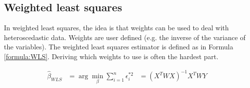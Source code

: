 \subsection{Weighted least squares}

In weighted least squares, the idea is that weights can be used to deal with heteroscedastic data.
Weights are user defined (e.g. the inverse of the variance of the variables).
The weighted least squares estimator is defined as in Formula \ref{formula:WLS}.
Deriving which weights to use is often the hardest part.

\begin{equation}
    \begin{aligned}
        \hat{\beta}_{WLS}   &= \arg\min_{\beta} \sum_{i=1}^{n} \epsilon_i^{*2} 
                            &= (X^TWX)^{-1} X^TWY
    \end{aligned}
    \label{formula:WLS}
\end{equation}

